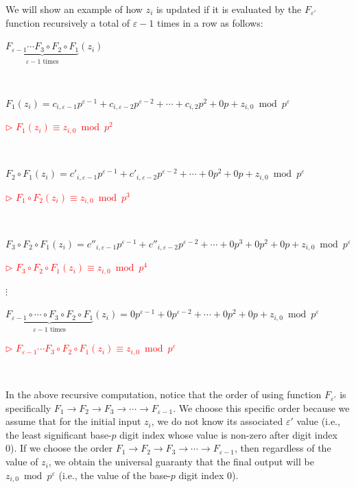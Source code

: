 We will show an example of how $z_i$ is updated if it is evaluated by the $F_{\varepsilon'}$ function recursively a total of $\varepsilon-1$ times in a row as follows:

$\underbrace{F_{\varepsilon-1} \cdots F_{3} \circ F_{2} \circ  F_{1}}_{\varepsilon-1 \text{ times}}(z_i)$

$ $

 $F_{1}(z_i) = c_{i,\varepsilon-1}p^{\varepsilon-1} + c_{i,\varepsilon-2}p^{\varepsilon-2} + \cdots + c_{i, 2}p^2 + 0p + z_{i, 0} \bmod p^\varepsilon$ 

\textcolor{red}{ $\rhd$ $F_{1}(z_i) \equiv z_{i,0} \bmod p^2$}

$ $

 $F_{2} \circ F_{1}(z_i) = c'_{i,\varepsilon-1}p^{\varepsilon-1} + c'_{i,\varepsilon-2}p^{\varepsilon-2} + \cdots + 0p^2 + 0p + z_{i, 0} \bmod p^\varepsilon$  

\textcolor{red}{ $\rhd$ $F_{1} \circ F_{2}(z_i) \equiv z_{i,0} \bmod p^3$} 

$ $

 $F_{3} \circ F_{2} \circ F_{1}(z_i) = c''_{i,\varepsilon-1}p^{\varepsilon-1} + c''_{i,\varepsilon-2}p^{\varepsilon-2} + \cdots + 0p^3 + 0p^2 + 0p + z_{i, 0} \bmod p^\varepsilon$  

\textcolor{red}{ $\rhd$ $F_{3} \circ F_{2} \circ F_{1}(z_i) \equiv z_{i,0} \bmod p^4$} 

$\vdots$

 $\underbrace{F_{\varepsilon-1}  \circ \cdots \circ F_{3} \circ F_{2} \circ F_{1}}_{\varepsilon-1 \text{ times}}(z_i) = 0p^{\varepsilon-1} + 0p^{\varepsilon-2} + \cdots + 0p^2 + 0p + z_{i, 0} \bmod p^\varepsilon$ 

\textcolor{red}{ $\rhd$ $F_{\varepsilon-1} \cdots F_{3} \circ F_{2} \circ F_{1}(z_i) \equiv z_{i,0} \bmod p^\varepsilon$} 

$ $



In the above recursive computation, notice that the order of using function $F_{\varepsilon'}$ is specifically $F_{1} \rightarrow F_{2} \rightarrow F_{3} \rightarrow \cdots \rightarrow F_{\varepsilon -1}$. We choose this specific order because we assume that for the initial input $z_i$, we do not know its associated $\varepsilon'$ value (i.e., the least significant base-$p$ digit index whose value is non-zero after digit index 0). If we choose the order $F_{1} \rightarrow F_{2} \rightarrow F_{3} \rightarrow \cdots \rightarrow F_{\varepsilon -1}$, then regardless of the value of $z_i$, we obtain the universal guaranty that the final output will be $z_{i,0} \bmod p^\varepsilon$ (i.e., the value of the base-$p$ digit index 0).

